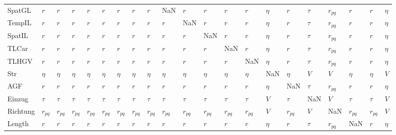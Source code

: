\begin{tabular}{lllllllllllllllllllll}
SpatGL   &       $r$ &       $r$ &       $r$ &       $r$ &       $r$ &       $r$ &       $r$ &       $r$ &       NaN &       $r$ &       $r$ &       $r$ &       $r$ &  $\eta$ &       $r$ &  $\tau$ &  $r_{pq}$ &       $r$ &       $r$ &  $\eta$ \\
TempIL   &       $r$ &       $r$ &       $r$ &       $r$ &       $r$ &       $r$ &       $r$ &       $r$ &       $r$ &       NaN &       $r$ &       $r$ &       $r$ &  $\eta$ &       $r$ &  $\tau$ &  $r_{pq}$ &       $r$ &       $r$ &  $\eta$ \\
SpatIL   &       $r$ &       $r$ &       $r$ &       $r$ &       $r$ &       $r$ &       $r$ &       $r$ &       $r$ &       $r$ &       NaN &       $r$ &       $r$ &  $\eta$ &       $r$ &  $\tau$ &  $r_{pq}$ &       $r$ &       $r$ &  $\eta$ \\
TLCar    &       $r$ &       $r$ &       $r$ &       $r$ &       $r$ &       $r$ &       $r$ &       $r$ &       $r$ &       $r$ &       $r$ &       NaN &       $r$ &  $\eta$ &       $r$ &  $\tau$ &  $r_{pq}$ &       $r$ &       $r$ &  $\eta$ \\
TLHGV    &       $r$ &       $r$ &       $r$ &       $r$ &       $r$ &       $r$ &       $r$ &       $r$ &       $r$ &       $r$ &       $r$ &       $r$ &       NaN &  $\eta$ &       $r$ &  $\tau$ &  $r_{pq}$ &       $r$ &       $r$ &  $\eta$ \\
Str      &    $\eta$ &    $\eta$ &    $\eta$ &    $\eta$ &    $\eta$ &    $\eta$ &    $\eta$ &    $\eta$ &    $\eta$ &    $\eta$ &    $\eta$ &    $\eta$ &    $\eta$ &     NaN &    $\eta$ &     $V$ &       $V$ &    $\eta$ &    $\eta$ &     $V$ \\
AGF      &       $r$ &       $r$ &       $r$ &       $r$ &       $r$ &       $r$ &       $r$ &       $r$ &       $r$ &       $r$ &       $r$ &       $r$ &       $r$ &  $\eta$ &       NaN &  $\tau$ &  $r_{pq}$ &       $r$ &       $r$ &  $\eta$ \\
Einzug   &    $\tau$ &    $\tau$ &    $\tau$ &    $\tau$ &    $\tau$ &    $\tau$ &    $\tau$ &    $\tau$ &    $\tau$ &    $\tau$ &    $\tau$ &    $\tau$ &    $\tau$ &     $V$ &    $\tau$ &     NaN &       $V$ &    $\tau$ &    $\tau$ &     $V$ \\
Richtung &  $r_{pq}$ &  $r_{pq}$ &  $r_{pq}$ &  $r_{pq}$ &  $r_{pq}$ &  $r_{pq}$ &  $r_{pq}$ &  $r_{pq}$ &  $r_{pq}$ &  $r_{pq}$ &  $r_{pq}$ &  $r_{pq}$ &  $r_{pq}$ &     $V$ &  $r_{pq}$ &     $V$ &       NaN &  $r_{pq}$ &  $r_{pq}$ &     $V$ \\
Length   &       $r$ &       $r$ &       $r$ &       $r$ &       $r$ &       $r$ &       $r$ &       $r$ &       $r$ &       $r$ &       $r$ &       $r$ &       $r$ &  $\eta$ &       $r$ &  $\tau$ &  $r_{pq}$ &       NaN &       $r$ &  $\eta$ \\

\end{tabular}
